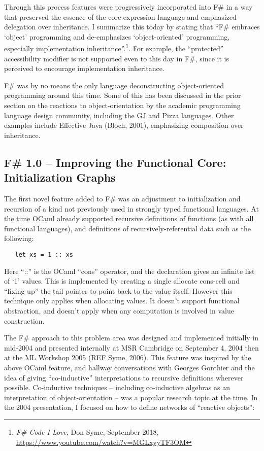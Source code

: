 \documentclass[acmsmall,review]{acmart}\settopmatter{printfolios=true,printccs=false,printacmref=false}
\begin{document}
Through this process features were progressively incorporated into F\# in a way that preserved the essence of the core expression language and emphasized delegation over inheritance.  I summarize this today by stating that “F\# embraces ‘object’ programming and de-emphasizes ‘object-oriented’ programming, especially implementation inheritance”.\footnote{\textit{F\# Code I Love}, Don Syme, September 2018, \url{https://www.youtube.com/watch?v=MGLxyyTF3OM}}.  For example, the “protected” accessibility modifier is not supported even to this day in F\#, since it is perceived to encourage implementation inheritance.

F\# was by no means the only language deconstructing object-oriented programming around this time. Some of this has been discussed in the prior section on the reactions to object-orientation by the academic programming language design community, including the GJ and Pizza languages. Other examples include Effective Java (Bloch, 2001), emphasizing composition over inheritance.


\subsection*{F\# 1.0 – Improving the Functional Core: Initialization Graphs}

The first novel feature added to F\# was an adjustment to initialization and recursion of a kind not previously used in strongly typed functional languages. At the time OCaml already supported recursive definitions of functions (as with all functional languages), and definitions of recursively-referential data such as the following:
\begin{verbatim}
   let xs = 1 :: xs
\end{verbatim}

Here “::” is the OCaml “cons” operator, and the declaration gives an infinite list of ‘1’ values. This is implemented by creating a single allocate cons-cell and “fixing up” the tail pointer to point back to the value itself.  However this technique only applies when allocating values.  It doesn’t support functional abstraction, and doesn’t apply when any computation is involved in value construction.

The F\# approach to this problem area was designed and implemented initially in mid-2004 and presented internally at MSR Cambridge on September 4, 2004 then at the ML Workshop 2005 (REF Syme, 2006). This feature was inspired by the above OCaml feature, and hallway conversations with Georges Gonthier and the idea of giving “co-inductive” interpretations to recursive definitions wherever possible.  Co-inductive techniques – including co-inductive algebras as an interpretation of object-orientation – was a popular research topic at the time. In the 2004 presentation, I focused on how to define networks of “reactive objects”: 
\end{document}
